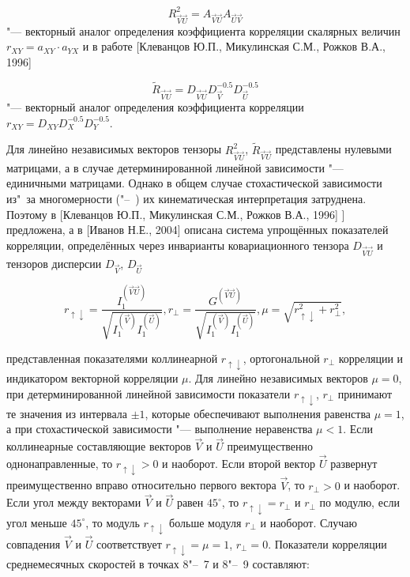 \begin{equation}
\label{eq:equation3_23}
{R^{2}_{\vec{V}\vec{U}}=A_{\vec{V}\vec{U}}A_{\vec{U}\vec{V}}}
\end{equation}  
"--- векторный аналог определения коэффициента корреляции скалярных величин $r_{XY}=a_{XY}\cdot a_{YX}$  и в работе [Клеванцов Ю.П., Микулинская С.М., Рожков В.А., 1996]
 
\begin{equation}
\label{eq:equation3_24}
{\tilde{R}_{\vec{V}\vec{U}}=D_{\vec{V}\vec{U}}D^{-0.5}_{\vec{V}}D^{-0.5}_{\vec{U}}}
\end{equation} 
"--- векторный аналог определения коэффициента корреляции $r_{XY}=D_{XY}D^{-0.5}_{X}D^{-0.5}_{Y}$. 

Для линейно независимых векторов тензоры $R^{2}_{\vec{V}\vec{U}}$, $\tilde{R}_{\vec{V}\vec{U}}$ представлены нулевыми матрицами, а в случае детерминированной линейной зависимости "--- единичными матрицами. 
Однако в общем случае стохастической зависимости из"~за многомерности ("--~) их кинематическая интерпретация затруднена. Поэтому в [Клеванцов Ю.П., Микулинская С.М., Рожков В.А., 1996] ] предложена, а в [Иванов Н.Е., 2004] описана система упрощённых показателей корреляции, определённых через инварианты ковариационного тензора $D_{\vec{V}\vec{U}}$ и тензоров дисперсии $D_{\vec{V}}$, $D_{\vec{U}}$
		
\begin{equation}
\label{eq:equation3_25}
{r_{\uparrow\downarrow}=\frac{I^{(\vec{V}\vec{U})}_{1}}{\sqrt{I^{(\vec{V})}_{1}I^{(\vec{U})}_{1}}}, r_{\perp}=\frac{G^{(\vec{V}\vec{U})}}{\sqrt{I^{(\vec{V})}_{1}I^{(\vec{U})}_{1}}}, \mu=\sqrt{r^{2}_{\uparrow\downarrow}+r^{2}_{\perp}}},
\end{equation} 		

представленная показателями коллинеарной $r_{\uparrow\downarrow}$, ортогональной $r_{\perp}$ корреляции и индикатором векторной корреляции $\mu$. Для линейно независимых векторов $\mu=0$, при детерминированной линейной зависимости показатели $r_{\uparrow\downarrow}$, $r_{\perp}$ принимают те значения из интервала $\pm1$, которые обеспечивают выполнения равенства $\mu=1$, а при стохастической зависимости "--- выполнение неравенства $\mu<1$. Если коллинеарные составляющие векторов $\vec{V}$ и $\vec{U}$ преимущественно однонаправленные, то $r_{\uparrow\downarrow}>0$ и наоборот. Если второй вектор $\vec{U}$ развернут преимущественно вправо относительно первого вектора $\vec{V}$, то $r_{\perp}>0$ и наоборот. Если угол между векторами $\vec{V}$ и $\vec{U}$ равен $45^{\circ}$, то $r_{\uparrow\downarrow}=r_{\perp}$ и $r_{\perp}$ по модулю, если угол меньше $45^{\circ}$, то модуль $r_{\uparrow\downarrow}$ больше модуля $r_{\perp}$ и наоборот. Случаю совпадения $\vec{V}$ и $\vec{U}$ соответствует $r_{\uparrow\downarrow}=\mu=1$, $r_{\perp}=0$.
Показатели корреляции среднемесячных скоростей в точках 8"--~7 и 8"--~9 составляют:

